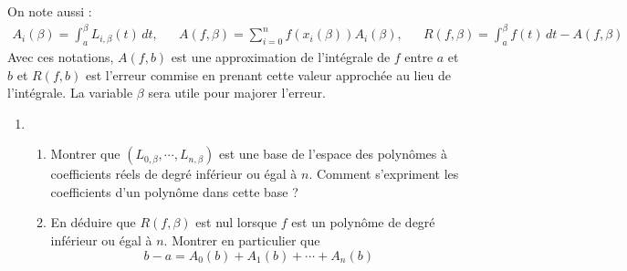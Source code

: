 On note aussi :
\begin{align*}
 A_i(\beta) = \int_{a}^{\beta}L_{i,\beta}(t)\,dt, & & 
 A(f,\beta) = \sum_{i=0}^{n}f(x_i(\beta))A_i(\beta), & &
 R(f,\beta) = \int_{a}^{\beta}f(t)\,dt -A(f,\beta) 
\end{align*}
Avec ces notations, $A(f,b)$ est une approximation de l'intégrale de $f$ entre $a$ et $b$ et $R(f,b)$ est l'erreur commise en prenant cette valeur approchée au lieu de l'intégrale. La variable $\beta$ sera utile pour majorer l'erreur.
\begin{enumerate}
\item \begin{enumerate}
 \item Montrer que $\left(L_{0,\beta},\cdots,L_{n,\beta} \right)$ est une base de l'espace des polynômes à coefficients réels de degré inférieur ou égal à $n$. Comment s'expriment les coefficients d'un polynôme dans cette base ? 
\item En déduire que $R(f,\beta)$ est nul lorsque $f$ est un polynôme de degré inférieur ou égal à $n$. Montrer en particulier que 
\begin{displaymath}
 b-a = A_0(b)+A_1(b)+\cdots+A_n(b)
\end{displaymath}


\end{enumerate}
\end{enumerate}
